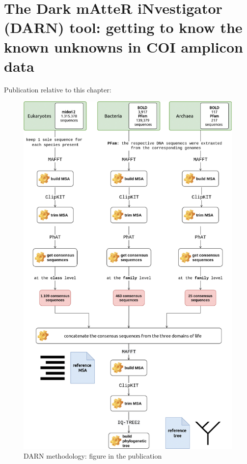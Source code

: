 \newpage

\section{The Dark mAtteR iNvestigator (DARN) tool: getting to know the known unknowns in COI amplicon data}

Publication relative to this chapter: \citep{zafeiropoulos2021dark}


\begin{figure}[!htbp]
   \centering
   \includegraphics[width=0.75\columnwidth]{figures/darn_methodology.jpg}
   \caption{DARN methodology: figure in the publication}
\end{figure}

